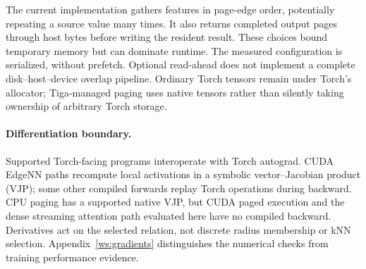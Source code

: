 The current implementation gathers features in page-edge order, potentially
repeating a source value many times. It also returns completed output pages
through host bytes before writing the resident result. These choices bound
temporary memory but can dominate runtime. The measured configuration is
serialized, without prefetch. Optional read-ahead does not implement a complete
disk--host--device overlap pipeline. Ordinary Torch tensors remain under Torch's
allocator; Tiga-managed paging uses native tensors rather than silently taking
ownership of arbitrary Torch storage.

\paragraph{Differentiation boundary.}
Supported Torch-facing programs interoperate with Torch autograd. CUDA EdgeNN
paths recompute local activations in a symbolic vector--Jacobian product (VJP);
some other compiled forwards replay Torch operations during backward. CPU
paging has a supported native VJP, but CUDA paged execution and the dense
streaming attention path evaluated here have no compiled backward. Derivatives
act on the selected relation, not discrete radius membership or kNN selection.
Appendix~\ref{ws:gradients} distinguishes the numerical checks from training
performance evidence.
